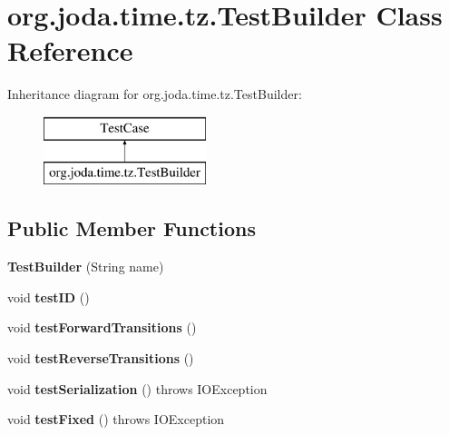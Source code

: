 \hypertarget{classorg_1_1joda_1_1time_1_1tz_1_1_test_builder}{\section{org.\-joda.\-time.\-tz.\-Test\-Builder Class Reference}
\label{classorg_1_1joda_1_1time_1_1tz_1_1_test_builder}
}
Inheritance diagram for org.\-joda.\-time.\-tz.\-Test\-Builder\-:\begin{figure}[H]
\begin{center}
\leavevmode
\includegraphics[height=2.000000cm]{classorg_1_1joda_1_1time_1_1tz_1_1_test_builder}
\end{center}
\end{figure}
\subsection*{Public Member Functions}
\begin{DoxyCompactItemize}
\item 
\hypertarget{classorg_1_1joda_1_1time_1_1tz_1_1_test_builder_a18df2f914f5bf02c3e698b308b2df8a8}{{\bfseries Test\-Builder} (String name)}\label{classorg_1_1joda_1_1time_1_1tz_1_1_test_builder_a18df2f914f5bf02c3e698b308b2df8a8}

\item 
\hypertarget{classorg_1_1joda_1_1time_1_1tz_1_1_test_builder_acbe30b3f79e79f554a81c6d7b3d17a9a}{void {\bfseries test\-I\-D} ()}\label{classorg_1_1joda_1_1time_1_1tz_1_1_test_builder_acbe30b3f79e79f554a81c6d7b3d17a9a}

\item 
\hypertarget{classorg_1_1joda_1_1time_1_1tz_1_1_test_builder_af0f5f3b022ffa86de443f9921f0d11aa}{void {\bfseries test\-Forward\-Transitions} ()}\label{classorg_1_1joda_1_1time_1_1tz_1_1_test_builder_af0f5f3b022ffa86de443f9921f0d11aa}

\item 
\hypertarget{classorg_1_1joda_1_1time_1_1tz_1_1_test_builder_a356a51948742a81857822f33952541f9}{void {\bfseries test\-Reverse\-Transitions} ()}\label{classorg_1_1joda_1_1time_1_1tz_1_1_test_builder_a356a51948742a81857822f33952541f9}

\item 
\hypertarget{classorg_1_1joda_1_1time_1_1tz_1_1_test_builder_a7192b0f895410ce7ed90859e8c1754ce}{void {\bfseries test\-Serialization} ()  throws I\-O\-Exception }\label{classorg_1_1joda_1_1time_1_1tz_1_1_test_builder_a7192b0f895410ce7ed90859e8c1754ce}

\item 
\hypertarget{classorg_1_1joda_1_1time_1_1tz_1_1_test_builder_abda7234d3d486d90211d8af06c4ad0e7}{void {\bfseries test\-Fixed} ()  throws I\-O\-Exception }\label{classorg_1_1joda_1_1time_1_1tz_1_1_test_builder_abda7234d3d486d90211d8af06c4ad0e7}

\end{DoxyCompactItemize}
